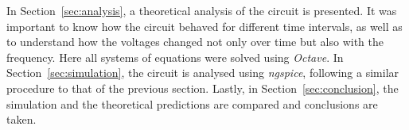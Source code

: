 
In Section~\ref{sec:analysis}, a theoretical analysis of the circuit is presented. It was important to know how the circuit behaved for different time intervals, as well as to understand how the voltages changed not only over time but also with the frequency. Here all systems of equations were solved using \textit{Octave}. In Section~\ref{sec:simulation}, the circuit is analysed using \textit{ngspice}, following a similar procedure to that of the previous section. Lastly, in Section~\ref{sec:conclusion}, the simulation and the theoretical predictions are compared and conclusions are taken.
